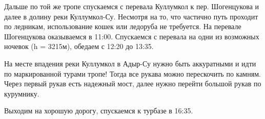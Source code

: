 Дальше по той же тропе спускаемся с перевала Куллумкол к пер. Шогенцукова и далее в долину реки Куллумкол-Су. Несмотря на то, что частично путь проходит
по ледникам, использование кошек или ледоруба не требуется.
На перевале Шогенцукова оказываемся в 11:00. Спускаемся с перевала на одни из возможных ночевок (h = 3215м), обедаем с 12:20 до 13:35.

На месте впадения реки Куллумкол в Адыр-Су нужно быть аккуратными и идти по маркированной турами тропе! Тогда все рукава можно перескочить по камням.
Через первый рукав есть надежный мост, далее нужно перейти большой рукав по курумнику.

Выходим на хорошую дорогу, спускаемся к турбазе в 16:35.



%



    \FloatBarrier
